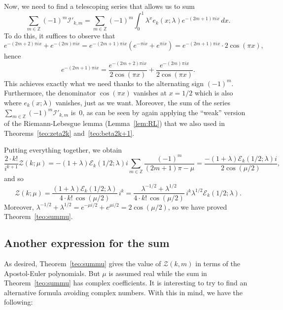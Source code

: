 \documentclass[11pt, oneside]{article}
\newcommand{\Z}{\mathbb{Z}}
\newcommand{\calE}{\mathcal{E}}
\newcommand{\calI}{\mathcal{I}}
\newcommand{\calZ}{\mathcal{Z}}
\theoremstyle{plain}
\theoremstyle{definition}
\begin{document}
Now, we need to find a telescoping series that allows us to sum
\[
  \sum_{m\in\Z} (-1)^m \calI'_{k,m}
  = \sum_{m\in\Z} (-1)^m \int_0^1 \lambda^x e_{k}(x;\lambda) e^{-(2m+1)\pi ix} \,dx.
\]
To do this, it suffices to observe that
\[
  e^{-(2m+2)\pi ix} + e^{-(2m)\pi ix} = e^{-(2m+1)\pi ix} (e^{-\pi ix} + e^{\pi ix}) 
  = e^{-(2m+1)\pi ix} \cdot 2 \cos(\pi x),
\]
hence
\begin{equation}
\label{eq:telescospi}
  e^{-(2m+1)\pi ix} = \frac{e^{-(2m+2)\pi ix}}{2 \cos(\pi x)} + \frac{e^{-(2m)\pi ix}}{2 \cos(\pi x)}.
\end{equation}
This achieves exactly what we need thanks to the alternating sign $(-1)^{m}$. Furthermore, the denominator $\cos(\pi x)$ vanishes at $x=1/2$ which is also where $e_{k}(x;\lambda)$ vanishes, just as we want. Moreover, the sum of the series $\sum_{m\in\Z} (-1)^m \calI'_{k,m}$ is~$0$, as can be seen by again applying the ``weak'' version of the Riemann-Lebesgue lemma (Lemma~\ref{lem:RL}) that we also used in Theorems~\ref{teo:zeta2k} and~\ref{teo:beta2k+1}.

Putting everything together, we obtain
\[
  \frac{2\cdot k!}{i^{k+1}} \calZ(k;\mu) = 
  - (1+\lambda)\calE_{k}(1/2;\lambda) i \sum_{m\in\Z} \frac{(-1)^m}{(2m+1)\pi-\mu}
  = \frac{- (1+\lambda)\calE_{k}(1/2;\lambda) i}{2 \cos(\mu/2)},
\]
and so
\[
  \calZ(k;\mu) = \frac{(1+\lambda)\calE_{k}(1/2;\lambda) }{4 \cdot k!\, \cos(\mu/2)}\,i^k
  = \frac{\lambda^{-1/2}+\lambda^{1/2}}{4 \cdot k!\, \cos(\mu/2)}\, i^k \lambda^{1/2}\calE_{k}(1/2;\lambda).
\]
Moreover, $\lambda^{-1/2}+\lambda^{1/2} = e^{-\mu i/2} + e^{\mu i/2} = 2 \cos(\mu/2)$, so we have proved Theorem~\ref{teo:summu}.

\subsection{Another expression for the sum}

As desired, Theorem~\ref{teo:summu} gives the value of $\calZ(k,m)$ in terms of the Apostol-Euler polynomials. But $\mu$ is assumed real while the sum in Theorem~\ref{teo:summu} has complex coefficients. It is interesting to try to find an alternative formula avoiding complex numbers. With this in mind, we have the following:
\end{document}
